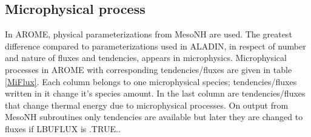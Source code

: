 \subsection{Microphysical process}
In AROME, physical parameterizations from MesoNH are used. The greatest difference compared to parameterizations used in ALADIN, in respect of number and nature of fluxes and tendencies, appears in microphysics.  Microphysical processes in AROME with corresponding tendencies/fluxes are given in table \ref{MiFlux}. Each column belongs to one microphysical species; tendencies/fluxes written in it change it's species amount. In the last column are tendencies/fluxes that change thermal energy due to microphysical processes. On output from MesoNH subroutines only tendencies are available but later they are changed to fluxes if LBUFLUX is .TRUE.. 

